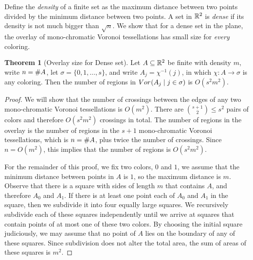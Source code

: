 \documentclass[a4paper]{article}
\newcommand {\mm}[1]   {\ifmmode{#1}\else{\mbox{\(#1\)}}\fi}
\newcommand{\Rspace}        {\mm{{\mathbb R}}}
\newcommand{\Overlay}[3]    {\mm{{\rm Vor}_{#1}{({#2}\mid{#3})}}}
\newcommand{\card}[1]       {\mm{{\#}{#1}}}
\theoremstyle{definition}
\newtheorem{theorem}{Theorem}
\numberwithin{theorem}{section}
\numberwithin{equation}{section}
\begin{document}
Define the \emph{density} of a finite set as the maximum distance between two points divided by the minimum distance between two points.
A set in $\Rspace^2$ is \emph{dense} if its density is not much bigger than $\sqrt{n}$.
We show that for a dense set in the plane, the overlay of mono-chromatic Voronoi tessellations has small size for \emph{every} coloring.

\begin{theorem}[Overlay size for Dense set]\label{thm:overlay_size_for_dense_set}
  Let $A \subseteq \Rspace^2$ be finite with density $m$, write $n = \card{A}$, let $\sigma = \{0,1,\ldots,s\}$, and write $A_j = \chi^{-1} (j)$, in which $\chi \colon A \to \sigma$ is any coloring.
  Then the number of regions in $\Overlay{}{A_j}{j \in \sigma}$ is $O(s^2 m^2)$.
\end{theorem}
\begin{proof}
  We will show that the number of crossings between the edges of any two mono-chromatic Voronoi tessellations is $O(m^2)$.
  There are $\binom{s+1}{2} \leq s^2$ pairs of colors and therefore $O(s^2 m^2)$ crossings in total.
  The number of regions in the overlay is the number of regions in the $s+1$ mono-chromatic Voronoi tessellations, which is $n = \card{A}$, plus twice the number of crossings.
  Since $n = O(m^2)$, this implies that the number of regions is $O(s^2 m^2)$.
  
  \medskip
  For the remainder of this proof, we fix two colors, $0$ and $1$, we assume that the minimum distance between points in $A$ is $1$, so the maximum distance is $m$.
  Observe that there is a square with sides of length $m$ that contains $A$, and therefore $A_0$ and $A_1$.
  If there is at least one point each of $A_0$ and $A_1$ in the square, then we subdivide it into four equally large squares.
  We recursively subdivide each of these squares independently until we arrive at squares that contain points of at most one of these two colors.
  By choosing the initial square judiciously, we may assume that no point of $A$ lies on the boundary of any of these squares.
  Since subdivision does not alter the total area, the sum of areas of these squares is $m^2$.
  

\end{proof}
\end{document}

